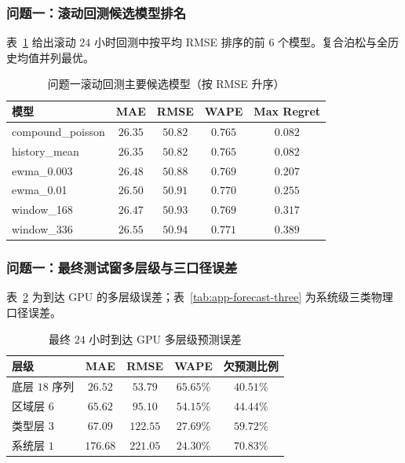 \documentclass[UTF8,a4paper,zihao=-4]{ctexart}
\begin{document}
\subsubsection{问题一：滚动回测候选模型排名}

表~\ref{tab:app-q1-backtest} 给出滚动 $24$ 小时回测中按平均 RMSE 排序的前 6 个模型。复合泊松与全历史均值并列最优。

\begin{table}[H]
\centering
\small
\caption{问题一滚动回测主要候选模型（按 RMSE 升序）}
\label{tab:app-q1-backtest}
\begin{tabular}{lcccc}
\toprule
模型 & MAE & RMSE & WAPE & Max Regret \\
\midrule
compound\_poisson & $26.35$ & $50.82$ & $0.765$ & $0.082$ \\
history\_mean & $26.35$ & $50.82$ & $0.765$ & $0.082$ \\
ewma\_0.003 & $26.48$ & $50.88$ & $0.769$ & $0.207$ \\
ewma\_0.01 & $26.50$ & $50.91$ & $0.770$ & $0.255$ \\
window\_168 & $26.47$ & $50.93$ & $0.769$ & $0.317$ \\
window\_336 & $26.55$ & $50.94$ & $0.771$ & $0.389$ \\
\bottomrule
\end{tabular}
\end{table}

\subsubsection{问题一：最终测试窗多层级与三口径误差}

表~\ref{tab:app-q1-multilevel} 为到达 GPU 的多层级误差；表~\ref{tab:app-forecast-three} 为系统级三类物理口径误差。

\begin{table}[H]
\centering
\small
\caption{最终 $24$ 小时到达 GPU 多层级预测误差}
\label{tab:app-q1-multilevel}
\begin{tabular}{lcccc}
\toprule
层级 & MAE & RMSE & WAPE & 欠预测比例 \\
\midrule
底层 $18$ 序列 & $26.52$ & $53.79$ & $65.65\%$ & $40.51\%$ \\
区域层 $6$ & $65.62$ & $95.10$ & $54.15\%$ & $44.44\%$ \\
类型层 $3$ & $67.09$ & $122.55$ & $27.69\%$ & $59.72\%$ \\
系统层 $1$ & $176.68$ & $221.05$ & $24.30\%$ & $70.83\%$ \\
\bottomrule
\end{tabular}
\end{table}
\end{document}
